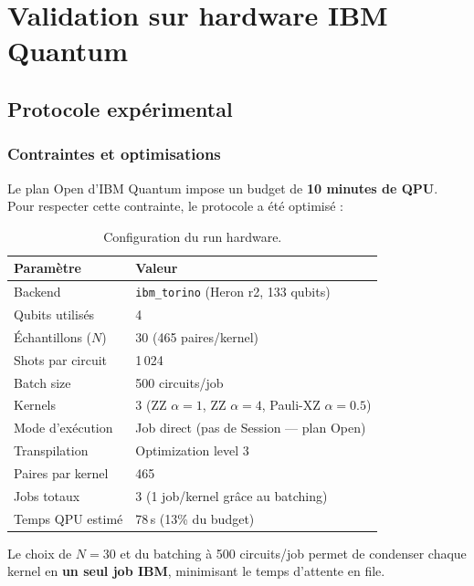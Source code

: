 \documentclass[12pt,a4paper]{article}
\begin{document}
\section{Validation sur hardware IBM Quantum}
\label{sec:hardware}

\subsection{Protocole expérimental}

\subsubsection{Contraintes et optimisations}

Le plan Open d'IBM Quantum impose un budget de \textbf{10 minutes de QPU}. Pour respecter cette contrainte, le protocole a été optimisé :

\begin{table}[H]
\centering
\caption{Configuration du run hardware.}
\label{tab:hw_config}
\begin{tabular}{ll}
\toprule
\textbf{Paramètre} & \textbf{Valeur} \\
\midrule
Backend        & \texttt{ibm\_torino} (Heron r2, 133 qubits) \\
Qubits utilisés & 4 \\
Échantillons ($N$) & 30 (465 paires/kernel) \\
Shots par circuit & 1\,024 \\
Batch size       & 500 circuits/job \\
Kernels          & 3 (ZZ $\alpha\!=\!1$, ZZ $\alpha\!=\!4$, Pauli-XZ $\alpha\!=\!0.5$) \\
Mode d'exécution & Job direct (pas de Session --- plan Open) \\
Transpilation    & Optimization level 3 \\
\midrule
Paires par kernel & 465 \\
Jobs totaux       & 3 (1 job/kernel grâce au batching) \\
Temps QPU estimé  & 78\,s (13\% du budget) \\
\bottomrule
\end{tabular}
\end{table}

Le choix de $N = 30$ et du batching à 500 circuits/job permet de condenser chaque kernel en \textbf{un seul job IBM}, minimisant le temps d'attente en file.
\end{document}
